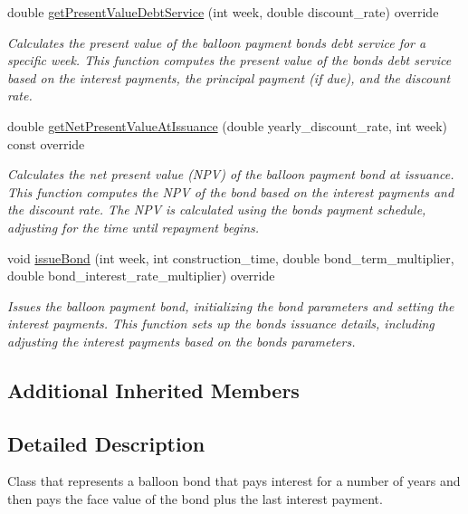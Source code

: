 \begin{DoxyCompactItemize}
double \mbox{\hyperlink{classBalloonPaymentBond_ae038863f7a3408c2c8cd503d8e789f2d}{get\+Present\+Value\+Debt\+Service}} (int week, double discount\+\_\+rate) override
\begin{DoxyCompactList}\small\item\em Calculates the present value of the balloon payment bond\textquotesingle{}s debt service for a specific week. This function computes the present value of the bond\textquotesingle{}s debt service based on the interest payments, the principal payment (if due), and the discount rate. \end{DoxyCompactList}\item 
double \mbox{\hyperlink{classBalloonPaymentBond_abbfaae70e003f057ec842d3889138345}{get\+Net\+Present\+Value\+At\+Issuance}} (double yearly\+\_\+discount\+\_\+rate, int week) const override
\begin{DoxyCompactList}\small\item\em Calculates the net present value (N\+PV) of the balloon payment bond at issuance. This function computes the N\+PV of the bond based on the interest payments and the discount rate. The N\+PV is calculated using the bond\textquotesingle{}s payment schedule, adjusting for the time until repayment begins. \end{DoxyCompactList}\item 
void \mbox{\hyperlink{classBalloonPaymentBond_af22552acd74b08dbb1d308cc5e45344c}{issue\+Bond}} (int week, int construction\+\_\+time, double bond\+\_\+term\+\_\+multiplier, double bond\+\_\+interest\+\_\+rate\+\_\+multiplier) override
\begin{DoxyCompactList}\small\item\em Issues the balloon payment bond, initializing the bond parameters and setting the interest payments. This function sets up the bond\textquotesingle{}s issuance details, including adjusting the interest payments based on the bond\textquotesingle{}s parameters. \end{DoxyCompactList}\end{DoxyCompactItemize}
\subsection*{Additional Inherited Members}


\subsection{Detailed Description}
Class that represents a balloon bond that pays interest for a number of years and then pays the face value of the bond plus the last interest payment. 

